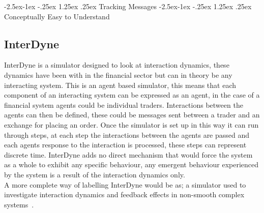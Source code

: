 \documentclass{article}
\makeatletter
\renewcommand\paragraph{\@startsection{paragraph}{4}{\z@}%
	{-2.5ex\@plus -1ex \@minus -.25ex}%
	{1.25ex \@plus .25ex}%
	{\normalfont\normalsize\bfseries}}
\makeatother
\begin{document}
\paragraph{Tracking Messages} 
\paragraph{Conceptually Easy to Understand} 

\subsection{InterDyne} 


InterDyne is a simulator designed to look at interaction dynamics, these dynamics have been with in the financial sector but can in theory be any interacting system. 
This is an agent based simulator, this means that each component of an interacting system can be expressed as an agent, in the case of a financial system agents could be individual traders. Interactions between the agents can then be defined, these could be messages sent between a trader and an exchange for placing an order. 
Once the simulator is set up in this way it can run through steps, at each step the interactions between the agents are passed and each agents response to the interaction is processed, these steps can represent discrete time.   
InterDyne adds no direct mechanism that would force the system as a whole to exhibit any specific behaviour, any emergent behaviour experienced by the system is a result of the interaction dynamics only.\\ 
A more complete way of labelling InterDyne would be as; a simulator used to investigate interaction dynamics and feedback effects in non-smooth complex systems~\cite{Chris_webPage}.
\end{document}
